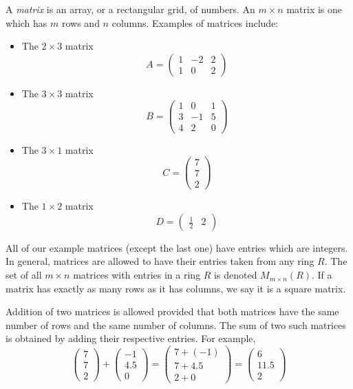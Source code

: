 \documentclass[12pt]{article}
\begin{document}
A {\em matrix} is an array, or a rectangular grid, of numbers. An $m
\times n$ matrix is one which has $m$ rows and $n$ columns. Examples of
matrices include:
\begin{itemize}
\item The $2 \times 3$ matrix
$$
A =
\begin{pmatrix}
1 & -2 & 2 \\
1 & 0 & 2
\end{pmatrix}
$$
\item The $3 \times 3$ matrix
$$
B =
\begin{pmatrix}
1 & 0 & 1 \\
3 & -1 & 5 \\
4 & 2 & 0
\end{pmatrix}
$$
\item The $3 \times 1$ matrix
$$
C =
\begin{pmatrix}
7 \\
7 \\
2
\end{pmatrix}
$$
\item The $1 \times 2$ matrix
$$
D =
\begin{pmatrix}
\frac{1}{2} & 2
\end{pmatrix}
$$
\end{itemize}

All of our example matrices (except the last one) have entries which are
integers. In general, matrices are allowed to have their entries taken
from any ring $R$. The set of all $m \times n$ matrices with entries in
a ring $R$ is denoted $M_{m \times n}(R)$. If a matrix has exactly as
many rows as it has columns, we say it is a square matrix.

Addition of two matrices is allowed provided that both matrices have the
same number of rows and the same number of columns. The sum of two such
matrices is obtained by adding their respective entries. For example,
$$
\begin{pmatrix}
7 \\
7 \\
2
\end{pmatrix} +
\begin{pmatrix}
-1 \\
4.5 \\
0
\end{pmatrix} =
\begin{pmatrix}
7 + (-1) \\
7 + 4.5 \\
2 + 0
\end{pmatrix} =
\begin{pmatrix}
6 \\
11.5 \\
2
\end{pmatrix}
$$
\end{document}
